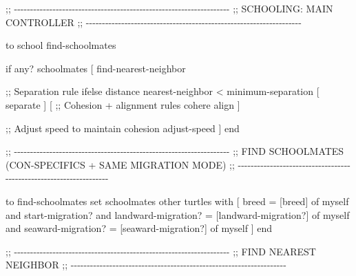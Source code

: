 \documentclass[
]{book}
\newenvironment{Shaded}{\begin{snugshade}}{\end{snugshade}}
\newcommand{\NormalTok}[1]{#1}
\begin{document}
\begin{Shaded}
\begin{Highlighting}[]
\NormalTok{;; {-}{-}{-}{-}{-}{-}{-}{-}{-}{-}{-}{-}{-}{-}{-}{-}{-}{-}{-}{-}{-}{-}{-}{-}{-}{-}{-}{-}{-}{-}{-}{-}{-}{-}{-}{-}{-}{-}{-}{-}{-}{-}{-}{-}{-}{-}{-}{-}{-}{-}{-}{-}{-}{-}{-}{-}{-}{-}{-}{-}{-}{-}{-}{-}{-}{-}{-}}
\NormalTok{;;  SCHOOLING: MAIN CONTROLLER}
\NormalTok{;; {-}{-}{-}{-}{-}{-}{-}{-}{-}{-}{-}{-}{-}{-}{-}{-}{-}{-}{-}{-}{-}{-}{-}{-}{-}{-}{-}{-}{-}{-}{-}{-}{-}{-}{-}{-}{-}{-}{-}{-}{-}{-}{-}{-}{-}{-}{-}{-}{-}{-}{-}{-}{-}{-}{-}{-}{-}{-}{-}{-}{-}{-}{-}{-}{-}{-}{-}}

\NormalTok{to school}
\NormalTok{  find{-}schoolmates}

\NormalTok{  if any? schoolmates [}
\NormalTok{    find{-}nearest{-}neighbor}

\NormalTok{    ;; Separation rule}
\NormalTok{    ifelse distance nearest{-}neighbor \textless{} minimum{-}separation}
\NormalTok{    [}
\NormalTok{      separate}
\NormalTok{    ]}
\NormalTok{    [}
\NormalTok{      ;; Cohesion + alignment rules}
\NormalTok{      cohere}
\NormalTok{      align}
\NormalTok{    ]}

\NormalTok{    ;; Adjust speed to maintain cohesion}
\NormalTok{    adjust{-}speed}
\NormalTok{  ]}
\NormalTok{end}


\NormalTok{;; {-}{-}{-}{-}{-}{-}{-}{-}{-}{-}{-}{-}{-}{-}{-}{-}{-}{-}{-}{-}{-}{-}{-}{-}{-}{-}{-}{-}{-}{-}{-}{-}{-}{-}{-}{-}{-}{-}{-}{-}{-}{-}{-}{-}{-}{-}{-}{-}{-}{-}{-}{-}{-}{-}{-}{-}{-}{-}{-}{-}{-}{-}{-}{-}{-}{-}{-}}
\NormalTok{;;  FIND SCHOOLMATES (CON{-}SPECIFICS + SAME MIGRATION MODE)}
\NormalTok{;; {-}{-}{-}{-}{-}{-}{-}{-}{-}{-}{-}{-}{-}{-}{-}{-}{-}{-}{-}{-}{-}{-}{-}{-}{-}{-}{-}{-}{-}{-}{-}{-}{-}{-}{-}{-}{-}{-}{-}{-}{-}{-}{-}{-}{-}{-}{-}{-}{-}{-}{-}{-}{-}{-}{-}{-}{-}{-}{-}{-}{-}{-}{-}{-}{-}{-}{-}}

\NormalTok{to find{-}schoolmates}
\NormalTok{  set schoolmates other turtles with [}
\NormalTok{    breed = [breed] of myself and}
\NormalTok{    start{-}migration? and}
\NormalTok{    landward{-}migration? = [landward{-}migration?] of myself and}
\NormalTok{    seaward{-}migration? = [seaward{-}migration?] of myself}
\NormalTok{  ]}
\NormalTok{end}


\NormalTok{;; {-}{-}{-}{-}{-}{-}{-}{-}{-}{-}{-}{-}{-}{-}{-}{-}{-}{-}{-}{-}{-}{-}{-}{-}{-}{-}{-}{-}{-}{-}{-}{-}{-}{-}{-}{-}{-}{-}{-}{-}{-}{-}{-}{-}{-}{-}{-}{-}{-}{-}{-}{-}{-}{-}{-}{-}{-}{-}{-}{-}{-}{-}{-}{-}{-}{-}{-}}
\NormalTok{;;  FIND NEAREST NEIGHBOR}
\NormalTok{;; {-}{-}{-}{-}{-}{-}{-}{-}{-}{-}{-}{-}{-}{-}{-}{-}{-}{-}{-}{-}{-}{-}{-}{-}{-}{-}{-}{-}{-}{-}{-}{-}{-}{-}{-}{-}{-}{-}{-}{-}{-}{-}{-}{-}{-}{-}{-}{-}{-}{-}{-}{-}{-}{-}{-}{-}{-}{-}{-}{-}{-}{-}{-}{-}{-}{-}{-}}


\end{Highlighting}
\end{Shaded}
\end{document}
